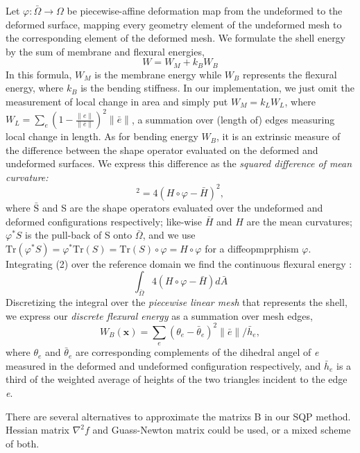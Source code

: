 \documentclass[a4paper,9pt,twocolumn]{extarticle}
\begin{document}
Let $\varphi:\bar\Omega\rightarrow\Omega$ be piecewise-affine deformation map from the undeformed to the deformed surface, mapping every geometry element of the undeformed mesh to the corresponding element of the deformed mesh. We formulate the shell energy by the sum of membrane and flexural energies,
\begin{equation}
  W=W_M+k_BW_B
\end{equation}
In this formula, $W_M$ is the membrane energy while $W_B$ represents the flexural energy, where $k_B$ is the bending stiffness. In our implementation, we just omit the measurement of local change in area and simply put $W_M=k_LW_L$, where $W_L=\sum_\textit{e}(1-\frac{\|\textit{e}\|}{\|\textit{$\bar e$}\|})^2\|\textit{$\bar e$}\|$, a summation over (length of) edges measuring local change in length. As for bending energy $W_B$, it is an extrinsic measure of the difference between the shape operator evaluated on the deformed and undeformed surfaces. We express this difference as the \textit{squared difference of mean curvature:}
\begin{equation}
  [\mathrm{Tr}(\varphi^*\mathrm{S})-\mathrm{Tr}(\mathrm{\bar S})]^2=4(H\circ\varphi-\bar H)^2,
\end{equation}
where $\bar{\mathrm{S}}$ and S are the shape operators evaluated over the undeformed and deformed configurations respectively; like-wise $\bar H$ and $H$ are the mean curvatures; $\varphi^*S$ is the pull-back of S onto $\bar\Omega$, and we use $\mathrm{Tr}(\varphi^*S)=\varphi^*\mathrm{Tr}(S)=\mathrm{Tr}(S)\circ\varphi=H\circ\varphi$ for a diffeopmprphism $\varphi$. Integrating (2) over the reference domain we find the continuous flexural energy :
\begin{equation}
  \int_{\bar\Omega} {4(H\circ\varphi-\bar H)}d\bar A
\end{equation}
Discretizing the integral over the \textit{piecewise linear mesh} that represents the shell, we express our \textit{discrete flexural energy} as a summation over mesh edges,
\begin{equation}
  W_B(\textbf{x})=\sum_{\textit{e}}(\theta_e - \bar{\theta}_e)^2\|\bar{e}\|/\bar{h}_e,
\end{equation}
where $\theta_e$ and $\bar\theta_e$ are corresponding complements of the dihedral angel of \textit{e} measured in the deformed and undeformed configuration respectively, and $\bar{h}_e$ is a third of the weighted average of heights of the two triangles incident to the edge \textit{e}.

There are several alternatives to approximate the matrixs B in our SQP method. Hessian matrix $\nabla^2 f$ and Guass-Newton matrix could be used, or a mixed scheme of both.
\end{document}
